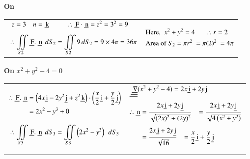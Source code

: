 \documentclass[11pt]{extarticle}
\renewcommand{\vec}[1]{\underline{\,\mathrm{#1}}}
\let\oldnabla\nabla
\renewcommand{\nabla}{\vec{\oldnabla}}
\newcommand{\miint}{\iint\displaylimits}
\begin{document}
\textbf{On }\\[1ex]
\begin{tabularx}{\textwidth}{X|X}
   $\begin{aligned}
      &\begin{array}{llcl}
         z=3 & n=\vec{k} &\tab& \therefore \vec{F} \cdot \vec{n}=z^2=3^2=9
      \end{array}\\[1ex]
      &\therefore \miint_{S2}\vec{F}.\ \vec{n} \ \,dS_2 = \miint_{S2} 9 \,dS_2 = 9 \times 4\pi = 36\pi
   \end{aligned}$
   &
   $\begin{aligned}
      & \text{Here, }
      \ x^2+y^2=4 \ \ \ \ \ \  \therefore r=2\\
      & \text{Area of }
      S_2=\pi r^2 \ =\pi(2)^2 \ =4 \pi
   \end{aligned}$
\end{tabularx}


\vspace{1ex}

\textbf{On } $x^2+y^2-4=0$

\begin{tabularx}{\textwidth}{X|X}
   $\begin{aligned}
      &\begin{aligned}
         \therefore \vec{F}.\ \vec{n} & =\left(4x\vec{i} - 2y^2 \vec{j}+ z^2 \vec{k}\right) \cdot\left(\frac{x}{2} \vec{i}+\frac{y}{2} \vec{j}\right) \\
         & =2x^2-y^3+0
      \end{aligned}\\[2ex]
      & \therefore \miint_{S3}\vec{F}.\ \vec{n} \ \,dS_3 =
      \miint_{S3}\left(2x^2-y^3\right) \ \,dS_3
   \end{aligned}$
   &
   $\begin{aligned}
      & \nabla(x^2+y^2-4)=2x\vec{i} + 2y\vec{j}\\[1ex]
      & \begin{aligned}
            \therefore \vec{n} & =
            \frac{2x\vec{i} + 2y\vec{j}}{\sqrt{(2x)^2+(2y)^2}}
            \tab =\frac{2x\vec{i} + 2y\vec{j}}{\sqrt{4\left(x^2+y^2\right)}} \\[1ex]
            & =\frac{2x\vec{i} + 2y\vec{j}}{\sqrt{16}}
            \tab =\frac{x}{2} \vec{i}+\frac{y}{2} \vec{j}
      \end{aligned}\\[2ex]
   \end{aligned}$
\end{tabularx}
\end{document}
